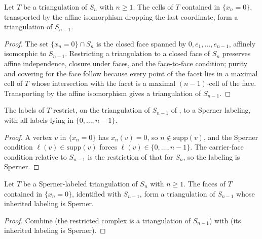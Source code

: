 \begin{lemma}
    \label{lem:facet-is-triangulation}
    Let $T$ be a triangulation of $S_n$ with $n \ge 1$. The cells of $T$
    contained in $\{x_n = 0\}$, transported by the affine isomorphism dropping the
    last coordinate, form a triangulation of $S_{n-1}$.
\end{lemma}
\begin{proof}
    The set $\{x_n = 0\} \cap S_n$ is the closed face spanned by
    $0, e_1, \dots, e_{n-1}$, affinely isomorphic to $S_{n-1}$. Restricting a
    triangulation to a closed face of $S_n$ preserves affine independence,
    closure under faces, and the face-to-face condition; purity and covering for
    the face follow because every point of the facet lies in a maximal cell of
    $T$ whose intersection with the facet is a maximal $(n-1)$-cell of the face.
    Transporting by the affine isomorphism gives a triangulation of $S_{n-1}$.
\end{proof}

\begin{lemma}
    \label{lem:facet-labeling-sperner}
    The labels of $T$ restrict, on the triangulation of $S_{n-1}$ of
    , to a Sperner labeling, with all labels
    lying in $\{0, \dots, n-1\}$.
\end{lemma}
\begin{proof}
    A vertex $v$ in $\{x_n = 0\}$ has $x_n(v) = 0$, so $n \notin \mathrm{supp}(v)$,
    and the Sperner condition $\ell(v) \in \mathrm{supp}(v)$ forces
    $\ell(v) \in \{0, \dots, n-1\}$. The carrier-face condition relative to
    $S_{n-1}$ is the restriction of that for $S_n$, so the labeling is Sperner.
\end{proof}

\begin{lemma}
    \label{lem:facet-restriction}
    \leanok
    Let $T$ be a Sperner-labeled triangulation of $S_n$ with $n \ge 1$. The faces
    of $T$ contained in $\{x_n = 0\}$, identified with $S_{n-1}$, form a
    triangulation of $S_{n-1}$ whose inherited labeling is Sperner.
\end{lemma}
\begin{proof}
    Combine  (the restricted complex is a
    triangulation of $S_{n-1}$) with  (its
    inherited labeling is Sperner).
\end{proof}

